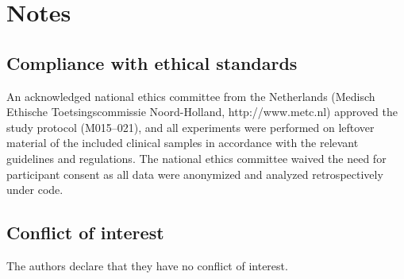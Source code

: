 \section*{Notes}

\subsection*{Compliance with ethical standards}

An acknowledged national ethics committee from the Netherlands (Medisch Ethische Toetsingscommissie Noord-Holland, http://www.metc.nl) approved the
study protocol (M015–021), and all experiments were performed on leftover material of the included clinical samples in accordance with the relevant
guidelines and regulations. The national ethics committee waived the need for participant consent as all data were anonymized and analyzed
retrospectively under code.

\subsection*{Conflict of interest}

The authors declare that they have no conflict of interest.

\footnotesize


\normalsize
